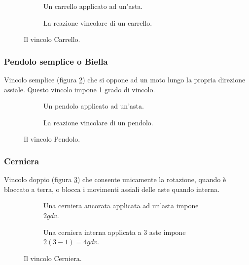 \documentclass[main.tex]{subfiles}
\begin{document}
\begin{figure}[H]
  \begin{subfigure}[b]{.5\textwidth}
  	\centering
  	\resizebox{0.5\textwidth}{!}{}
  	\caption{Un carrello applicato ad un’asta.}
  \end{subfigure}
  \hfill
  \begin{subfigure}[b]{.5\textwidth}
  \centering
  	\resizebox{0.5\textwidth}{!}{}
  	\caption{La reazione vincolare di un carrello.}
  \end{subfigure}
  \caption{Il vincolo Carrello.}
  \label{carrello}
\end{figure}

\subsubsection{Pendolo semplice o Biella}
Vincolo semplice (figura \ref{biella}) che si oppone ad un moto lungo la propria direzione assiale. Questo vincolo impone 1 grado di vincolo.

\begin{figure}[H]
  \begin{subfigure}[b]{.5\textwidth}
  	\centering
  	\resizebox{0.5\textwidth}{!}{}
  	\caption{Un pendolo applicato ad un’asta.}
  \end{subfigure}
  \hfill
  \begin{subfigure}[b]{.5\textwidth}
  \centering
  	\resizebox{0.5\textwidth}{!}{}
  	\caption{La reazione vincolare di un pendolo.}
  \end{subfigure}
  \caption{Il vincolo Pendolo.}
  \label{biella}
\end{figure}

\subsubsection{Cerniera}
Vincolo doppio (figura \ref{cerniera}) che consente unicamente la rotazione, quando è bloccato a terra, o blocca i movimenti assiali delle aste quando interna.

\begin{figure}[H]
  \begin{subfigure}[b]{.5\textwidth}
  	\centering
  	\resizebox{0.5\textwidth}{!}{}
  	\caption{Una cerniera ancorata applicata ad un’asta impone $2 gdv$.}
  \end{subfigure}
  \hfill
  \begin{subfigure}[b]{.5\textwidth}
  \centering
  	\resizebox{0.5\textwidth}{!}{}
  	\caption{Una cerniera interna applicata a 3 aste impone $2(3 - 1) = 4gdv$.}
  \end{subfigure}
  \caption{Il vincolo Cerniera.}
  \label{cerniera}
\end{figure}
\end{document}
